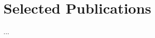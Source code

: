 \section{\textbf{Selected Publications}}
\resumeSubHeadingListStart
    \item{...}
\resumeSubHeadingListEnd